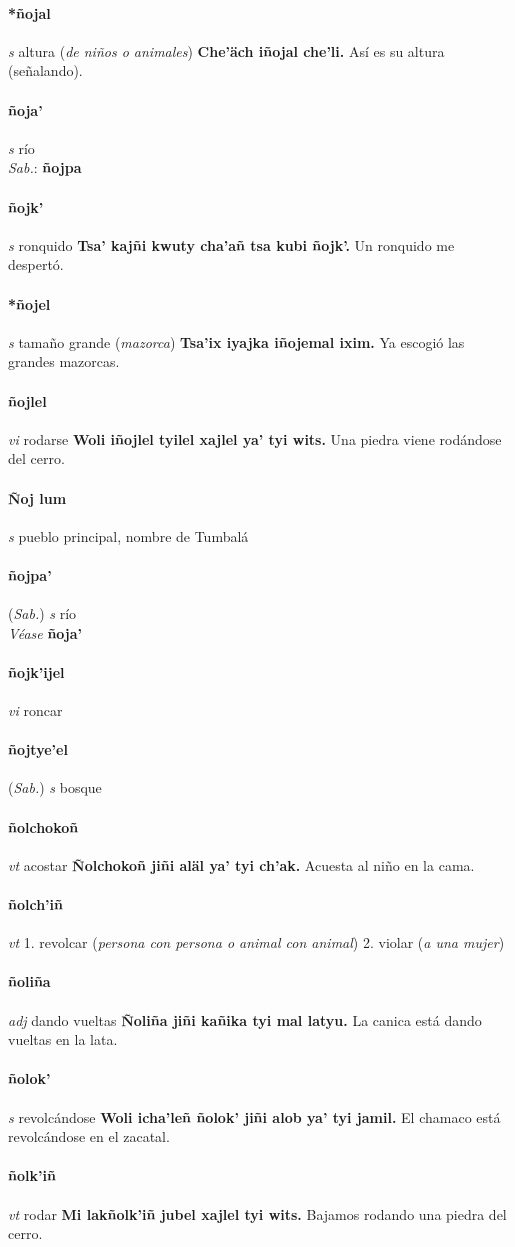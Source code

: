 \documentclass{scrbook}
\newcommand{\entry}[1]{\paragraph{#1}}
\newcommand{\onedefinition}[1]{#1.}
\newcommand{\partofspeech}[1]{\textit{#1}}
\newcommand{\spanishtranslation}[1]{#1}
\newcommand{\clarification}[1]{(\textit{#1})}
\newcommand{\cholexample}[1]{\textbf{#1}}
\newcommand{\exampletranslation}[1]{#1}
\newcommand{\dialectvariant}[1]{\\\textit{#1}:}
\newcommand{\dialectword}[1]{\textbf{#1}}
\newcommand{\alsosee}[1]{\\\textit{Véase} \textbf{#1}}
\newcommand{\relevantdialect}[1]{(\textit{#1})}
\begin{document}
\begin{multicols}{2}
\entry{*ñojal}
\partofspeech{s}
\spanishtranslation{altura}
\clarification{de niños o animales}
\cholexample{Che'äch iñojal che'li.}
\exampletranslation{Así es su altura (señalando).}

\entry{ñoja'}
\partofspeech{s}
\spanishtranslation{río}
\dialectvariant{Sab.}
\dialectword{ñojpa}

\entry{ñojk'}
\partofspeech{s}
\spanishtranslation{ronquido}
\cholexample{Tsa' kajñi kwuty cha'añ tsa kubi ñojk'.}
\exampletranslation{Un ronquido me despertó.}

\entry{*ñojel}
\partofspeech{s}
\spanishtranslation{tamaño grande}
\clarification{mazorca}
\cholexample{Tsa'ix iyajka iñojemal ixim.}
\exampletranslation{Ya escogió las grandes mazorcas.}

\entry{ñojlel}
\partofspeech{vi}
\spanishtranslation{rodarse}
\cholexample{Woli iñojlel tyilel xajlel ya' tyi wits.}
\exampletranslation{Una piedra viene rodándose del cerro.}

\entry{Ñoj lum}
\partofspeech{s}
\spanishtranslation{pueblo principal, nombre de Tumbalá}

\entry{ñojpa'}
\relevantdialect{Sab.}
\partofspeech{s}
\spanishtranslation{río}
\alsosee{ñoja'}

\entry{ñojk'ijel}
\partofspeech{vi}
\spanishtranslation{roncar}

\entry{ñojtye'el}
\relevantdialect{Sab.}
\partofspeech{s}
\spanishtranslation{bosque}

\entry{ñolchokoñ}
\partofspeech{vt}
\spanishtranslation{acostar}
\cholexample{Ñolchokoñ jiñi aläl ya' tyi ch'ak.}
\exampletranslation{Acuesta al niño en la cama.}

\entry{ñolch'iñ}
\partofspeech{vt}
\onedefinition{1}
\spanishtranslation{revolcar}
\clarification{persona con persona o animal con animal}
\onedefinition{2}
\spanishtranslation{violar}
\clarification{a una mujer}

\entry{ñoliña}
\partofspeech{adj}
\spanishtranslation{dando vueltas}
\cholexample{Ñoliña jiñi kañika tyi mal latyu.}
\exampletranslation{La canica está dando vueltas en la lata.}

\entry{ñolok'}
\partofspeech{s}
\spanishtranslation{revolcándose}
\cholexample{Woli icha'leñ ñolok' jiñi alob ya' tyi jamil.}
\exampletranslation{El chamaco está revolcándose en el zacatal.}

\entry{ñolk'iñ}
\partofspeech{vt}
\spanishtranslation{rodar}
\cholexample{Mi lakñolk'iñ jubel xajlel tyi wits.}
\exampletranslation{Bajamos rodando una piedra del cerro.}


\end{multicols}
\end{document}
